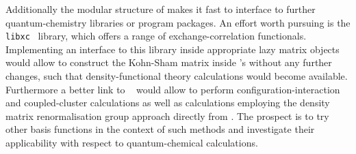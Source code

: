 Additionally the modular structure of \molsturm
makes it fast to interface to
further quantum-chemistry libraries or program packages.
An effort worth pursuing is the \texttt{libxc}~\cite{Lehtola2018} library,
which offers a range of exchange-correlation functionals.
Implementing an interface to this library inside appropriate
lazy matrix objects would allow to construct the Kohn-Sham matrix
inside \molsturm's \SCF without any further changes,
such that density-functional theory calculations would become available.
Furthermore a better link to \pyscf~\cite{Sun2017}
would allow to perform configuration-interaction
and coupled-cluster calculations as well as calculations
employing the density matrix renormalisation group approach
directly from \molsturm.
The prospect is to try other basis functions
in the context of such methods
and investigate their applicability with respect to quantum-chemical
calculations.



